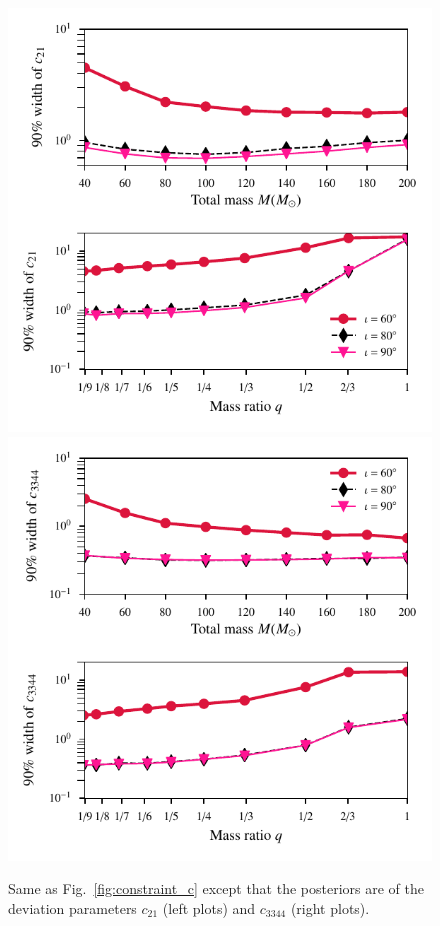 \documentclass[prd,preprintnumbers,twocolumn,eqsecnum,floatfix,a4paper,nofootinbib,superscriptaddress]{revtex4}
\begin{document}
\begin{figure}[tbh]
	\begin{center}
		\includegraphics[scale=0.75]{figs/90_percent_bounds_c2.pdf}
		\includegraphics[scale=0.75]{figs/90_percent_bounds_c34.pdf}
	\end{center}
	\caption{Same as Fig.~\ref{fig:constraint_c} except that the posteriors are of the deviation parameters $c_{21}$ (left plots) and  $c_{3344}$ (right plots).}
	\label{fig:constraint_c21_c3344}
\end{figure}
\end{document}
